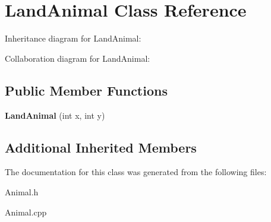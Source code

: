 \hypertarget{classLandAnimal}{}\section{Land\+Animal Class Reference}
\label{classLandAnimal}


Inheritance diagram for Land\+Animal\+:


Collaboration diagram for Land\+Animal\+:
\subsection*{Public Member Functions}
\begin{DoxyCompactItemize}
\item 
{\bfseries Land\+Animal} (int x, int y)\hypertarget{classLandAnimal_a93384d0797a56eac2e276b8b2f5cd4f1}{}\label{classLandAnimal_a93384d0797a56eac2e276b8b2f5cd4f1}

\end{DoxyCompactItemize}
\subsection*{Additional Inherited Members}


The documentation for this class was generated from the following files\+:\begin{DoxyCompactItemize}
\item 
Animal.\+h\item 
Animal.\+cpp\end{DoxyCompactItemize}
